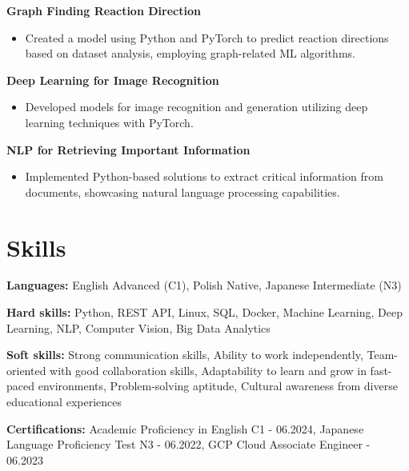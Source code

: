 \documentclass[10pt, letterpaper]{article}
\begin{document}
\noindent\textbf{Graph Finding Reaction Direction}

\vspace{5pt}
\begin{itemize}
    
    \item Created a model using Python and PyTorch to predict reaction directions based on dataset analysis, employing graph-related ML algorithms.
    
\end{itemize}

\noindent\textbf{Deep Learning for Image Recognition}

\vspace{5pt}
\begin{itemize}
    
    \item Developed models for image recognition and generation utilizing deep learning techniques with PyTorch.
    
\end{itemize}

\noindent\textbf{NLP for Retrieving Important Information}

\vspace{5pt}
\begin{itemize}
    
    \item Implemented Python-based solutions to extract critical information from documents, showcasing natural language processing capabilities.
    
\end{itemize}


\section*{Skills}
\noindent\textbf{Languages:} 
English Advanced (C1), Polish Native, Japanese Intermediate (N3)
\vspace{5pt}

\noindent\textbf{Hard skills:}
Python, REST API, Linux, SQL, Docker, Machine Learning, Deep Learning, NLP, Computer Vision, Big Data Analytics
\vspace{5pt}

\noindent\textbf{Soft skills:}
Strong communication skills, Ability to work independently, Team-oriented with good collaboration skills, Adaptability to learn and grow in fast-paced environments, Problem-solving aptitude, Cultural awareness from diverse educational experiences
\vspace{5pt}

\noindent\textbf{Certifications:}
Academic Proficiency in English C1 - 06.2024, Japanese Language Proficiency Test N3 - 06.2022, GCP Cloud Associate Engineer - 06.2023
\end{document}
